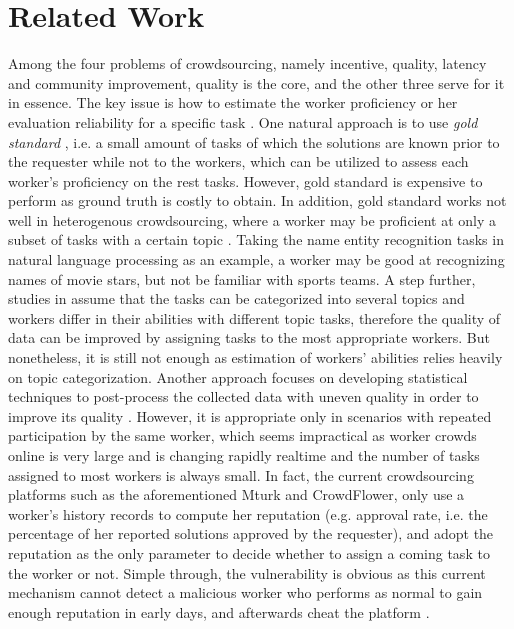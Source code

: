 \documentclass[letterpaper]{article}
\theoremstyle{definition}
\begin{document}
\section{Related Work}
Among the four problems of crowdsourcing, namely incentive, quality, latency and community improvement, quality  is the core, and the other three serve for it in essence. The key issue is how to estimate the worker proficiency \cite{simpson2015bayesian} or her evaluation reliability for a specific task \cite{miller2005eliciting,radanovic2013robust}. One natural approach is to use \emph{gold standard} \cite{liu2012cdas,li2015crowd}, i.e. a small amount of tasks of which the solutions are known prior to the requester while not to the workers, which can be utilized to assess each worker's proficiency on the rest tasks. However, gold standard is expensive to perform as ground truth is costly to obtain. In addition, gold standard works not well in heterogenous crowdsourcing, where a worker may be proficient at only a subset of tasks with a certain topic \cite{zhang2015task}. Taking the name entity recognition tasks in natural language processing \cite{ritter2011named} as an example, a worker may be good at recognizing names of movie stars, but not be familiar with sports teams. A step further, studies in \cite{ipeirotis2014repeated,simpson2015bayesian} assume that the tasks can be categorized into several topics and workers differ in their abilities with different topic tasks, therefore the quality of data can be improved by assigning tasks to the most appropriate workers. But nonetheless, it is still not enough as  estimation of workers' abilities relies  heavily on topic categorization.
Another approach focuses on developing statistical techniques to post-process the collected data with uneven quality in order to improve its quality \cite{raykar2010learning,zhou2014aggregating}. However, it is appropriate only in scenarios with  repeated participation by the same worker, which seems impractical as worker crowds online is very large and is changing rapidly realtime and the number of tasks assigned to most workers is always small. In fact, the current crowdsourcing platforms such as the aforementioned Mturk and CrowdFlower, only use a worker's history records to compute her reputation (e.g. approval rate, i.e. the percentage of her reported solutions approved by the requester), and adopt the reputation as the only parameter to decide whether to assign a coming task to the worker or not. Simple through, the vulnerability is obvious as this current mechanism cannot detect a malicious worker who performs as normal to gain enough reputation in early days, and afterwards cheat the platform \cite{hoffman2009survey}.








\end{document}
